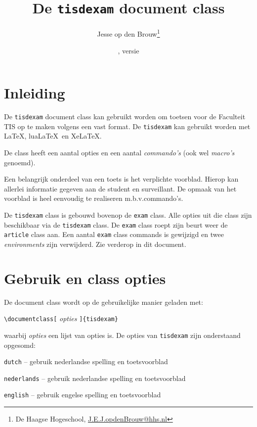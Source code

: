 \documentclass[dutch,a4paper,12pt,addpoints,fleqn,oneside]{tisdexam}
\newcommand\DocClass[1]{\texttt{#1}}
\newcommand\Option[1]{\texttt{#1}}
\begin{document}
\raggedbottom
\title{De \DocClass{tisdexam} document class}
\author{Jesse op den Brouw\thanks{De Haagse Hogeschool,
        \url{J.E.J.opdenBrouw@hhs.nl}}}
\date{\tisdexamfiledate, versie \tisdexamfileversion}
\maketitle
\setcounter{footnote}{1}


\section{Inleiding}
\label{sec:abstract}
De \DocClass{tisdexam} document class kan gebruikt worden om toetsen voor
de Faculteit TIS op te maken volgens een vast format. De \DocClass{tisdexam}
kan gebruikt worden met \LaTeX, lua\LaTeX\ en Xe\LaTeX.

\medskip
De class heeft een aantal opties en een aantal \textsl{commando's} (ook wel
\textsl{macro's} genoemd).

\medskip
Een belangrijk onderdeel van een toets is het verplichte voorblad. Hierop kan
allerlei informatie gegeven aan de student en surveillant. De opmaak van het
voorblad is heel eenvoudig te realiseren m.b.v.\@ commando's.

\medskip
De \DocClass{tisdexam} class is gebouwd bovenop de \DocClass{exam}
class. Alle opties uit die class zijn beschikbaar via de
\DocClass{tisdexam} class. De \DocClass{exam} class roept zijn
beurt weer de \DocClass{article} class aan.
Een aantal \DocClass{exam} class commands is gewijzigd en twee
\textsl{environments} zijn verwijderd. Zie verderop in dit document.


\section{Gebruik en class opties}
De document class wordt op de gebruikelijke manier geladen met:
\bigskip

\verb|\documentclass[| \textsl{opties} \verb|]{tisdexam}|
\bigskip

\noindent
waarbij \textsl{opties} een lijst van opties is. De opties van \DocClass{tisdexam} zijn
onderstaand opgesomd:
\smallskip

\Option{dutch} -- gebruik nederlandse spelling en toetsvoorblad

\Option{nederlands} -- gebruik nederlandse spelling  en toetsvoorblad

\Option{english} -- gebruik engelse spelling en toetsvoorblad
\end{document}
